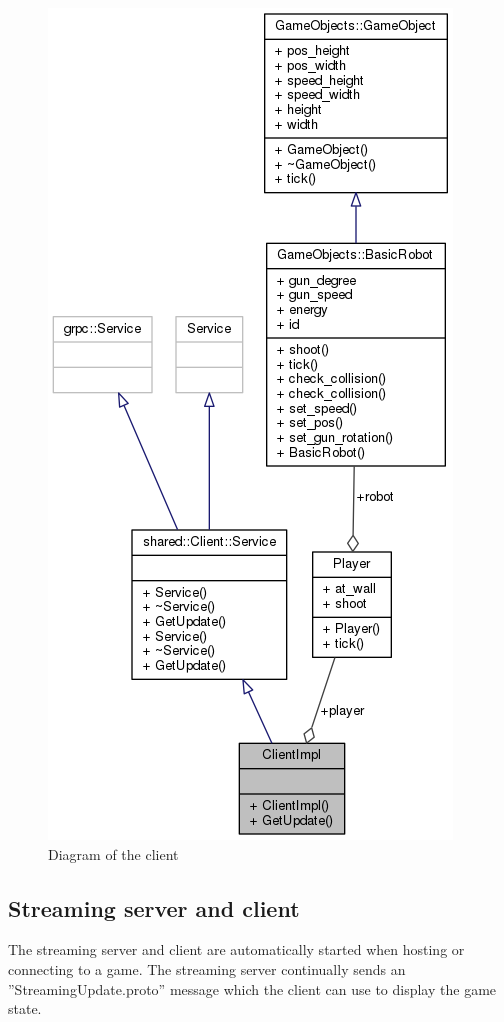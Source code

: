 \documentclass[12pt]{report}
\begin{document}
\begin{figure}[h]
\centering
\includegraphics[scale = 0.5]{ClientImpl_graph.png}
\caption{Diagram of the client}
\medskip
\end{figure}

\subsection{Streaming server and client}
The streaming server and client are automatically started when hosting or connecting to a game. The streaming server continually sends an ''StreamingUpdate.proto'' message which the client can use to display the game state.
\end{document}
